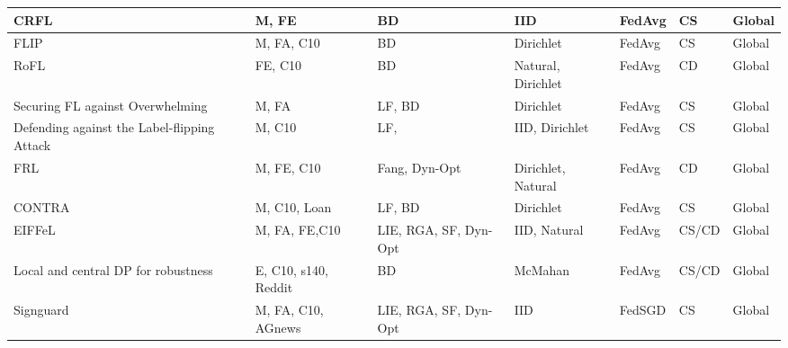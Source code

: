 \begin{table*}[]
\begin{tabular}{|l|p{2cm}|p{2.7cm}|l|p{1.5cm}|p{.7cm}|l|}
CRFL~\cite{xie2021crfl}                                            & M, FE                & BD                               & IID                        & FedAvg                & CS               & Global              \\ \hline
FLIP~\cite{zhang2022flip}                                            & M, FA, C10           & BD                               & Dirichlet                  & FedAvg                & CS               & Global              \\ \hline
RoFL~\cite{burkhalter2021rofl}                                            & FE, C10              & BD                               & Natural, Dirichlet         & FedAvg                & CD               & Global              \\ \hline
Securing FL against Overwhelming~\cite{ranjan2022securing}                & M, FA                & LF, BD                           & Dirichlet                  & FedAvg                & CS               & Global              \\ \hline
Defending against the Label-flipping Attack~\cite{jebreel2022defending}     & M, C10               & LF,                              & IID, Dirichlet             & FedAvg                & CS               & Global              \\ \hline
FRL~\cite{mozaffari2021frl}                                             & M, FE, C10           & Fang, Dyn-Opt                     & Dirichlet, Natural         & FedAvg                & CD               & Global              \\ \hline
CONTRA~\cite{awan2021contra}                                          & M, C10, Loan         & LF, BD                           & Dirichlet                  & FedAvg                & CS               & Global              \\ \hline
EIFFeL~\cite{roy2022eiffel}                                          & M, FA, FE,C10        & LIE, RGA, SF, Dyn-Opt             & IID, Natural               & FedAvg                & CS/CD            & Global              \\ \hline
Local and central DP for robustness~\cite{naseri2020local}         & E, C10, s140, Reddit & BD                               & McMahan                    & FedAvg                & CS/CD            & Global              \\ \hline
Signguard~\cite{xu2021signguard}                                       & M, FA, C10, AGnews   & LIE, RGA, SF, Dyn-Opt             & IID                        & FedSGD                & CS               & Global              \\ \hline

\end{tabular}
\end{table*}
